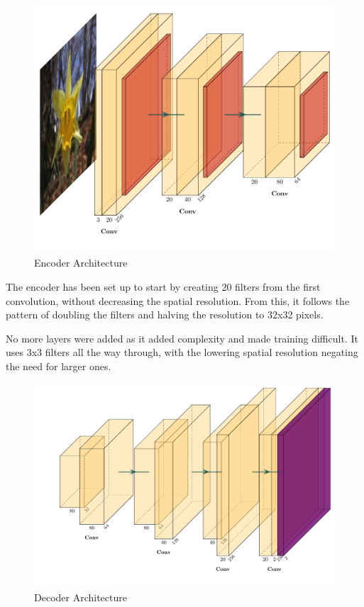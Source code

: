 \documentclass{article}
\begin{document}
\begin{figure}[H]
    \centering
    \includegraphics[width=\linewidth]{unetEncode.pdf}
    \caption{Encoder Architecture}
\end{figure}

The encoder has been set up to start by creating 20 filters from the first convolution, without decreasing the spatial resolution. From this, it follows the pattern of doubling the filters and halving the resolution to 32x32 pixels. 

No more layers were added as it added complexity and made training difficult. It uses 3x3 filters all the way through, with the lowering spatial resolution negating the need for larger ones.

\begin{figure}[H]
    \centering
    \includegraphics[width=\linewidth]{unetDecode.pdf}
    \caption{Decoder Architecture}
\end{figure}
\end{document}
